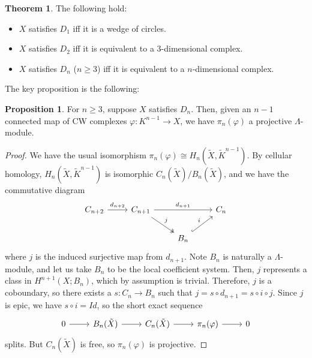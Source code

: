 \documentclass{article}
\theoremstyle{definition}
\newtheorem{theorem}{Theorem}[section]
\theoremstyle{definition}
\theoremstyle{definition}
\theoremstyle{definition}
\newtheorem{proposition}{Proposition}[theorem]
\theoremstyle{definition}
\theoremstyle{definition}
\theoremstyle{definition}
\begin{document}
\begin{tcolorbox}[colback=red!5!white,colframe=red!30!white]
\begin{theorem}The following hold:
  \begin{itemize}
    \item $X$ satisfies $D_1$ iff it is a wedge of circles.
    \item $X$ satisfies $D_2$ iff it is equivalent to a $3$-dimensional complex.
    \item $X$ satisfies $D_n$ ($n\geq 3$) iff it is equivalent to a $n$-dimensional complex. 
  \end{itemize}

\end{theorem}
\end{tcolorbox}

The key proposition is the following: 

\begin{tcolorbox}[colback=blue!5!white,colframe=blue!30!white]
\begin{proposition}
For $n\geq 3$, suppose $X$ satisfies $D_n$. Then, given an $n-1$ connected map of CW complexes $\varphi: K^{n-1}\to X$, we have $\pi_n(\varphi)$ a projective $\Lambda$-module. 
\end{proposition}
\end{tcolorbox}
\begin{proof}
  We have the usual isomorphism $\pi_n(\varphi)\cong H_n(\tilde{X},\tilde{K}^{n-1})$. By cellular homology, $H_n(\tilde{X},\tilde{K}^{n-1})$ is isomorphic $C_n(\tilde{X})/B_n(\tilde{X})$, and we have the commutative diagram
  \[\begin{tikzcd}
  C_{n+2}\arrow[r,"d_{n+2}"]&C_{n+1}\arrow[dr,twoheadrightarrow,"j"]\arrow[rr,"d_{n+1}"]&&C_n\\
  &&B_n\arrow[ur,hookrightarrow,"i"]
  \end{tikzcd}\]
where $j$ is the induced surjective map from $d_{n+1}$. Note $B_n$ is naturally a $\Lambda$-module, and let us take $B_n$ to be the local coefficient system. Then, $j$ represents a class in $H^{n+1}(X;B_n)$, which by assumption is trivial. Therefore, $j$ is a coboundary, so there exists a $s: C_n\to B_n$ such that $j=s\circ d_{n+1}=s\circ i\circ j$. Since $j$ is epic, we have $s\circ i=Id$, so the short exact sequence 
\[\begin{tikzcd}
0\arrow[r]&B_n(\tilde{X})\arrow[r]&C_n(\tilde{X})\arrow[r]&\pi_n(\varphi)\arrow[r]&0
\end{tikzcd}\] 
splits. But $C_n(\tilde{X})$ is free, so $\pi_n(\varphi)$ is projective. 
\end{proof}
\end{document}
